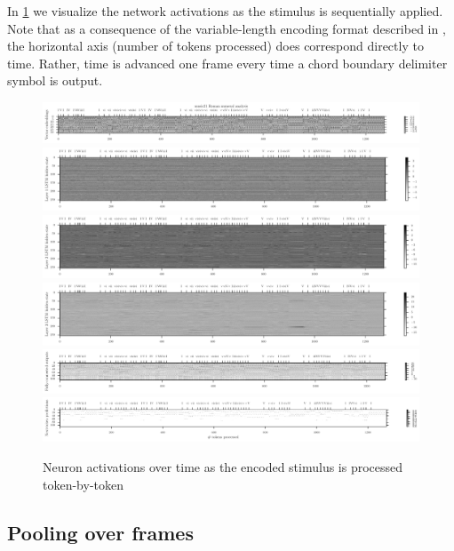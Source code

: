 In \cref{fig:model-analysis-tokens} we visualize the network activations as
the stimulus is sequentially applied. Note that as a consequence of the
variable-length encoding format described in , the horizontal axis
(number of tokens processed) does correspond directly to time. Rather, time
is advanced one frame every time a chord boundary delimiter symbol is output.

\begin{figure}[tb]
    \centering
    \includegraphics[width=1.0\linewidth]{model-analysis-tokens-0.pdf}
    \includegraphics[width=1.0\linewidth]{model-analysis-tokens-1.pdf}
    \includegraphics[width=1.0\linewidth]{model-analysis-tokens-2.pdf}
    \includegraphics[width=1.0\linewidth]{model-analysis-tokens-3.pdf}
    \includegraphics[width=1.0\linewidth]{model-analysis-tokens-4.pdf}
    \includegraphics[width=1.0\linewidth]{model-analysis-tokens-5.pdf}
    \caption{Neuron activations over time as the encoded stimulus is processed token-by-token}
    \label{fig:model-analysis-tokens}
\end{figure}

\subsection{Pooling over frames}


